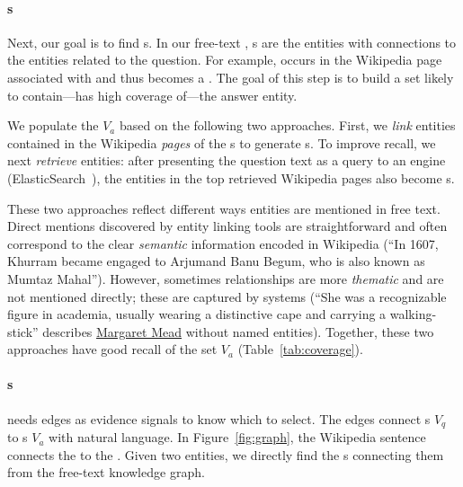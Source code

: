 
\paragraph{\rightnode{}s}

Next, our goal is to find \rightnode{}s.
In our free-text , \rightnode{}s are the entities with 
 connections to the entities related to the question.
For example,  occurs in the Wikipedia page associated
with \leftnode{}  and thus becomes
a \rightnode{}.
The goal of this step is to build a set likely to
contain---has high coverage of---the answer entity.

We populate the \rightnode{} $V_a$ based 
on the following two approaches.
%
First, we \textit{link} entities contained in the Wikipedia \emph{pages} of
the \leftnode{}s to generate \rightnode{}s.
%
%
To improve \rightnode{} recall, we next \textit{retrieve} entities:
after presenting the question text as a query to an  engine
(ElasticSearch~\cite{Gormley:2015:EDG:2904394}), the entities in the
top retrieved Wikipedia pages also become \rightnode{}s.

These two approaches reflect different ways entities are mentioned
in free text.
%
Direct mentions discovered by entity linking tools are straightforward
and often correspond to the clear \emph{semantic} information encoded in
Wikipedia (``In 1607, Khurram became engaged to Arjumand Banu Begum,
who is also known as Mumtaz Mahal'').
%
However, sometimes relationships are more \emph{thematic} and are not
mentioned directly; these are captured by  systems
(``She was a recognizable figure in academia, usually wearing a
distinctive cape and carrying a walking-stick'' describes
\underline{Margaret Mead} without named entities).
%
Together, these two approaches have good recall of the \rightnode{}
set $V_a$ (Table~\ref{tab:coverage}).

\paragraph{\tweennode{}s}

\name{} needs edges as evidence signals to know which \rightnode{} to select.
%
%
The edges
connect \leftnode{}s $V_q$ to \rightnode{}s
$V_a$ with natural language.
%
In Figure~\ref{fig:graph}, the Wikipedia sentence
 connects the
\leftnode{}  to the \rightnode{}
.
%
Given two entities, we directly find the \tweennode{}s connecting them
from the free-text knowledge graph.


